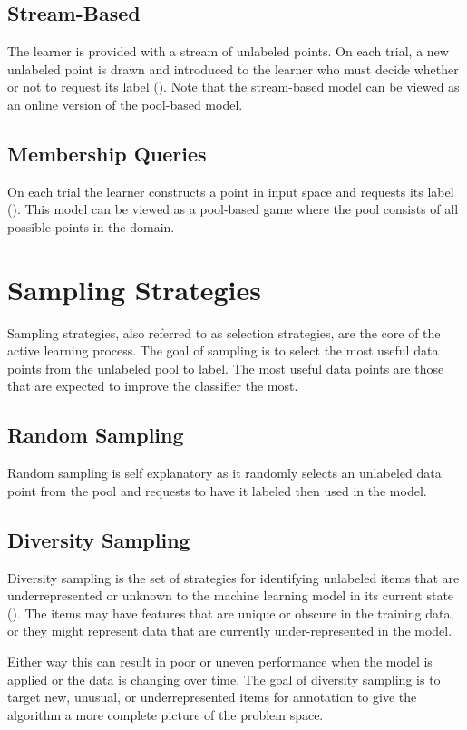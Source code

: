 \subsection{Stream-Based}
The learner is provided with a stream of unlabeled points. On each trial, a new unlabeled point is drawn and introduced to the learner who must decide whether or not to request its label (\cite{baram2004online}). Note that the stream-based model can be viewed as an online version of the pool-based model. 

\subsection{Membership Queries}
On each trial the learner constructs a point in input space and requests its label (\cite{baram2004online}). This model can be viewed as a pool-based game where the pool consists of all possible points in the domain.

\section{Sampling Strategies}

Sampling strategies, also referred to as selection strategies, are the core of the active learning process. The goal of sampling is to select the most useful data points from the unlabeled pool to label. The most useful data points are those that are expected to improve the classifier the most.

\subsection{Random Sampling}
Random sampling is self explanatory as it randomly selects an unlabeled data point from the pool and requests to have it labeled then used in the model.

\subsection{Diversity Sampling}
Diversity sampling is the set of strategies for identifying unlabeled items that are underrepresented or unknown to the machine learning model in its current state (\cite{munro2021human}). The items may have features that are unique or obscure in the training data, or they might represent data that are currently under-represented in the model. 

Either way this can result in poor or uneven performance when the model is applied or the data is changing over time. The goal of diversity sampling is to target new, unusual, or underrepresented items for annotation to give the algorithm a more complete picture of the problem space. 

